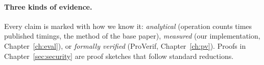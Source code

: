 \documentclass[11pt,a4paper,openany]{report}
\begin{document}
\paragraph{Three kinds of evidence.} Every claim is marked with how we know it: \emph{analytical} (operation counts times published timings, the method
of the base paper), \emph{measured} (our implementation, Chapter~\ref{ch:eval}), or \emph{formally verified} (ProVerif, Chapter~\ref{ch:pv}).
Proofs in Chapter~\ref{sec:security} are proof sketches that follow standard reductions.

\tableofcontents
\listoffigures
\listoftables

















\appendix

\end{document}
